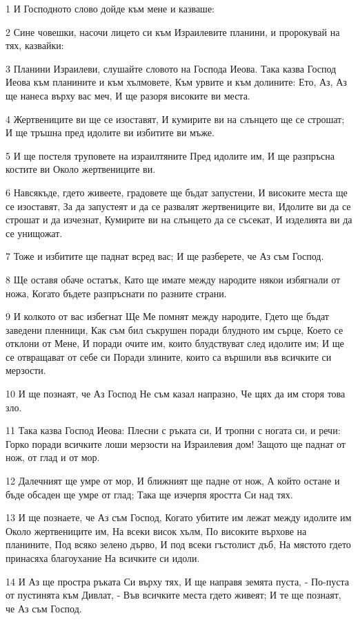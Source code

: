 \par 1 И Господното слово дойде към мене и казваше:
\par 2 Сине човешки, насочи лицето си към Израилевите планини, и пророкувай на тях, казвайки:
\par 3 Планини Израилеви, слушайте словото на Господа Иеова. Така казва Господ Иеова към планините и към хълмовете, Към урвите и към долините: Ето, Аз, Аз ще нанеса върху вас меч, И ще разоря високите ви места.
\par 4 Жертвениците ви ще се изоставят, И кумирите ви на слънцето ще се строшат; И ще тръшна пред идолите ви избитите ви мъже.
\par 5 И ще постеля труповете на израилтяните Пред идолите им, И ще разпръсна костите ви Около жертвениците ви.
\par 6 Навсякъде, гдето живеете, градовете ще бъдат запустени, И високите места ще се изоставят, За да запустеят и да се развалят жертвениците ви, Идолите ви да се строшат и да изчезнат, Кумирите ви на слънцето да се съсекат, И изделията ви да се унищожат.
\par 7 Тоже и избитите ще паднат всред вас; И ще разберете, че Аз съм Господ.
\par 8 Ще оставя обаче остатък, Като ще имате между народите някои избягнали от ножа, Когато бъдете разпръснати по разните страни.
\par 9 И колкото от вас избегнат Ще Ме помнят между народите, Гдето ще бъдат заведени пленници, Как съм бил съкрушен поради блудното им сърце, Което се отклони от Мене, И поради очите им, които блудствуват след идолите им; И ще се отвращават от себе си Поради злините, които са вършили във всичките си мерзости.
\par 10 И ще познаят, че Аз Господ Не съм казал напразно, Че щях да им сторя това зло.
\par 11 Така казва Господ Иеова: Плесни с ръката си, И тропни с ногата си, и речи: Горко поради всичките лоши мерзости на Израилевия дом! Защото ще паднат от нож, от глад и от мор.
\par 12 Далечният ще умре от мор, И ближният ще падне от нож, А който остане и бъде обсаден ще умре от глад; Така ще изчерпя яростта Си над тях.
\par 13 И ще познаете, че Аз съм Господ, Когато убитите им лежат между идолите им Около жертвениците им, На всеки висок хълм, По високите върхове на планините, Под всяко зелено дърво, И под всеки гъстолист дъб, На мястото гдето принасяха благоухание На всичките си идоли.
\par 14 И Аз ще простра ръката Си върху тях, И ще направя земята пуста, - По-пуста от пустинята към Дивлат, - Във всичките места гдето живеят; И те ще познаят, че Аз съм Господ.

